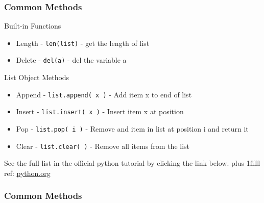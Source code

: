 \documentclass[fleqn]{beamer} %
\newcommand{\sectiontitleIII}{Common Methods}
\newcommand{\btVFill}{\vskip0pt plus 1filll}
\begin{document}
	\begin{frame}[label=sectionIII, containsverbatim] \small
		\frametitle{\sectiontitleIII}

		Built-in Functions 
		\begin{itemize}
			\item Length - \lstinline{len(list)} - get the length of list
			\item Delete - \lstinline{del(a)} - del the variable a
		\end{itemize}	

	    List Object Methods
		\begin{itemize}

		\item Append -  \lstinline{list.append( x )} - Add item x to end of list \\ 
		\item Insert -   \lstinline{list.insert( x )} - Insert item x at position \\ 
		\item Pop -  \lstinline{list.pop( i )} - Remove and item in list at position i and return it \\ 
		\item Clear -  \lstinline{list.clear( )} - Remove all items from the list \\ 

		\end{itemize}

		\vspace*{10mm}
		See the full list in the official python tutorial by clicking the link below. 
		\btVFill
		\tiny{ref: \href{https://docs.python.org/3/tutorial/datastructures.html#more-on-lists}{python.org}}

	\end{frame}


	\begin{frame} \small
		\frametitle{\sectiontitleIII}
		
		
		
	\end{frame}


\end{document}
